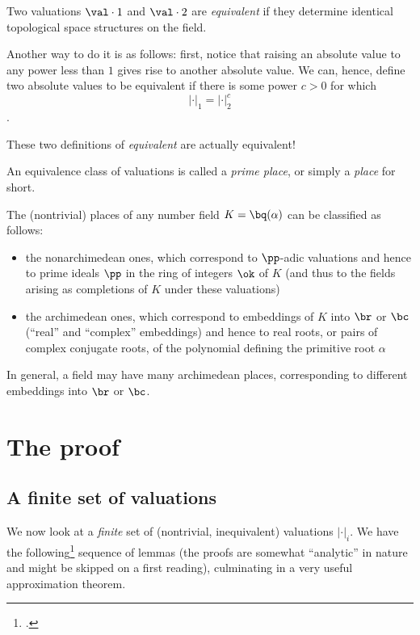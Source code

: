 \begin{defn}
  Two valuations $\val \cdot 1$ and $\val\cdot2$ are \textit{equivalent} if
  they determine identical topological space structures on the field.
\end{defn}

Another way to do it is as follows: first, notice that raising an absolute value
to any power less than $1$ gives rise to another absolute value. We can, hence,
define two absolute values to be equivalent if there is some power $c > 0$
for which \[|\cdot|_1 = |\cdot|_2^c\].

These two definitions of \textit{equivalent} are actually equivalent!

\begin{defn}
  An equivalence class of valuations is called a \textit{prime place}, or simply
  a \textit{place} for short.
\end{defn}

The (nontrivial) places of any number field $K=\bq(\alpha)$ can be classified as follows:

\begin{itemize}
\item the nonarchimedean ones, which correspond to $\pp$-adic valuations and hence
  to prime ideals $\pp$ in the ring of integers $\ok$ of $K$ (and thus to the
  fields arising as completions of $K$ under these valuations)
\item the archimedean ones, which correspond to embeddings of $K$ into $\br$
  or $\bc$ (``real'' and ``complex'' embeddings) and hence to real roots, or
  pairs of complex conjugate roots, of the polynomial defining the primitive
  root $\alpha$
\end{itemize}

In general, a field may have many archimedean places, corresponding to different
embeddings into $\br$ or $\bc$.

\section{The proof}
\subsection{A finite set of valuations}
\label{sec:orgheadline3}

We now look at a \textit{finite} set of (nontrivial, inequivalent) valuations
$|\cdot|_i$. We have the following\footcite[p. 471--2]{artinwhaples} sequence of
lemmas (the proofs are somewhat ``analytic'' in nature and might be skipped on a
first reading), culminating in a very useful approximation theorem.

